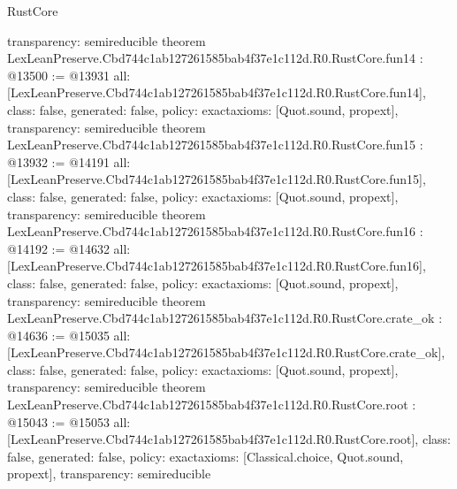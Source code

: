 \begin{lexlean}{RustCore}
\begin{coremodule}
{  transparency: semireducible
}
theorem LexLeanPreserve.Cbd744c1ab127261585bab4f37e1c112d.R0.RustCore.fun14 : @13500 := @13931 {
  all: [LexLeanPreserve.Cbd744c1ab127261585bab4f37e1c112d.R0.RustCore.fun14],
  class: false,
  generated: false,
  policy: exact{axioms: [Quot.sound, propext]},
  transparency: semireducible
}
theorem LexLeanPreserve.Cbd744c1ab127261585bab4f37e1c112d.R0.RustCore.fun15 : @13932 := @14191 {
  all: [LexLeanPreserve.Cbd744c1ab127261585bab4f37e1c112d.R0.RustCore.fun15],
  class: false,
  generated: false,
  policy: exact{axioms: [Quot.sound, propext]},
  transparency: semireducible
}
theorem LexLeanPreserve.Cbd744c1ab127261585bab4f37e1c112d.R0.RustCore.fun16 : @14192 := @14632 {
  all: [LexLeanPreserve.Cbd744c1ab127261585bab4f37e1c112d.R0.RustCore.fun16],
  class: false,
  generated: false,
  policy: exact{axioms: [Quot.sound, propext]},
  transparency: semireducible
}
theorem LexLeanPreserve.Cbd744c1ab127261585bab4f37e1c112d.R0.RustCore.crate_ok : @14636 := @15035 {
  all: [LexLeanPreserve.Cbd744c1ab127261585bab4f37e1c112d.R0.RustCore.crate_ok],
  class: false,
  generated: false,
  policy: exact{axioms: [Quot.sound, propext]},
  transparency: semireducible
}
theorem LexLeanPreserve.Cbd744c1ab127261585bab4f37e1c112d.R0.RustCore.root : @15043 := @15053 {
  all: [LexLeanPreserve.Cbd744c1ab127261585bab4f37e1c112d.R0.RustCore.root],
  class: false,
  generated: false,
  policy: exact{axioms: [Classical.choice, Quot.sound, propext]},
  transparency: semireducible
}


\end{coremodule}
\end{lexlean}
